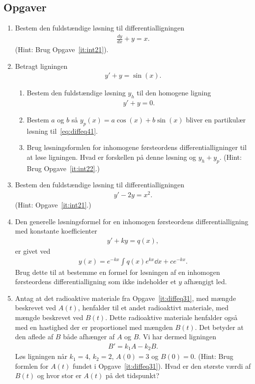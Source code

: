 \subsection{Opgaver}
\begin{enumerate}
	
	
	
	\item Bestem den fuldstændige løsning til differentialligningen 
	\begin{align*}
	\frac{dy}{dx}+y=x.
	\end{align*}
	(Hint: Brug Opgave~\ref{it:int21}).
	
	\item Betragt ligningen 
	\begin{align}\label{eq:diffeq41}
	y'+y=\sin(x).
	\end{align}
	\begin{enumerate}
		\item Bestem den fuldstændige løsning $y_h$ til den homogene ligning
		\begin{align*}
		y'+y=0.
		\end{align*}
		\item Bestem $a$ og $b$ så $y_p(x)=a\cos(x)+b\sin(x)$ bliver en partikulær løsning til~\eqref{eq:diffeq41}. 
		\item Brug løsningsformlen for inhomogene førsteordens differentialligninger til at løse ligningen. Hvad er forskellen på denne løsning og $y_h+y_p$. (Hint: Brug Opgave~\ref{it:int22}.)
	\end{enumerate}

	\item Bestem den fuldstændige løsning til differentialligningen 
	\begin{align*}
	y'-2y=x^2.
	\end{align*}
	(Hint: Opgave~\ref{it:int21}.)
	
	\item Den generelle løsningsformel for en inhomogen førsteordens differentialligning med konstante koefficienter
	\begin{align*}
	y'+ky=q(x),
	\end{align*}
	er givet ved
	\begin{align*}
	y(x)=e^{-kx}\int q(x)e^{kx}\dd x+ ce^{-kx}.
	\end{align*}
	Brug dette til at bestemme en formel for løsningen af en inhomogen førsteordens differentialligning som ikke indeholder et $y$ afhængigt led.
	
	
	
	\item Antag at det radioaktive materiale fra Opgave~\ref{it:diffeq31}, med mængde beskrevet ved $A(t)$, henfalder til et andet radioaktivt materiale, med mængde beskrevet ved $B(t)$. Dette radioaktive materiale henfalder også med en hastighed der er proportionel med mængden $B(t)$. Det betyder at den aflede af $B$ både afhænger af $A$ og $B$. Vi har dermed ligningen
	\begin{align*}
	B'=k_1 A-k_2 B.
	\end{align*} 
	Løs ligningen når $k_1=4$, $k_2=2$, $A(0)=3$ og $B(0)=0$. (Hint: Brug formlen for $A(t)$ fundet i Opgave~\ref{it:diffeq31}). Hvad er den største værdi af $B(t)$ og hvor stor er $A(t)$ på det tidspunkt?
	

\end{enumerate}

